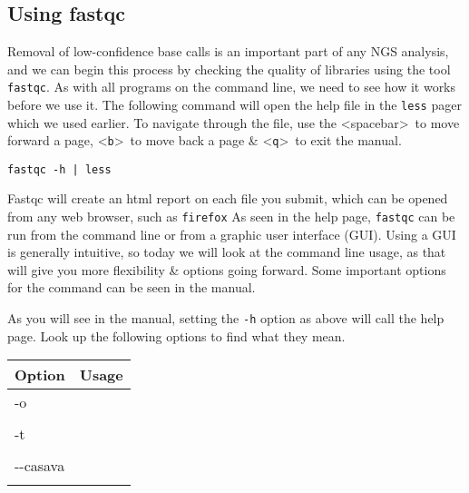 
\chapter{\moduleTitle}
\newpage

\section{Using fastqc}
\begin{steps}
Removal of low-confidence base calls is an important part of any NGS analysis, and we can begin this process by checking the quality of libraries using the tool \texttt{fastqc}.
As with all programs on the command line, we need to see how it works before we use it.
The following command will open the help file in the \texttt{less} pager which we used earlier.
To navigate through the file, use the \textless spacebar\textgreater ~to move forward a page, \textless \texttt{b}\textgreater ~to move back a page \& \textless \texttt{q}\textgreater ~to exit the manual. \\
\begin{lstlisting}
fastqc -h | less
\end{lstlisting}
\end{steps}

\begin{note}
Fastqc will create an html report on each file you submit, which can be opened from any web browser, such as \texttt{firefox}
As seen in the help page, \texttt{fastqc} can be run from the command line or from a graphic user interface (GUI).
Using a GUI is generally intuitive, so today we will look at the command line usage, as that will give you more flexibility \& options going forward.
Some important options for the command can be seen in the manual.\\
\end{note}
\begin{steps}
As you will see in the manual, setting the \texttt{-h} option as above will call the help page.
Look up the following options to find what they mean. \\
\begin{center}
\begin{tabular}[h]{|p{4cm}|p{8cm}|}
  \hline
  \textbf{Option} & \textbf{Usage} \\
  \hline
  -o & \\
   & \\
   \hline
  -t & \\
   & \\
   \hline
   -{}-casava & \\
   & \\
   \hline
\end{tabular}
\end{center}
\end{steps}


